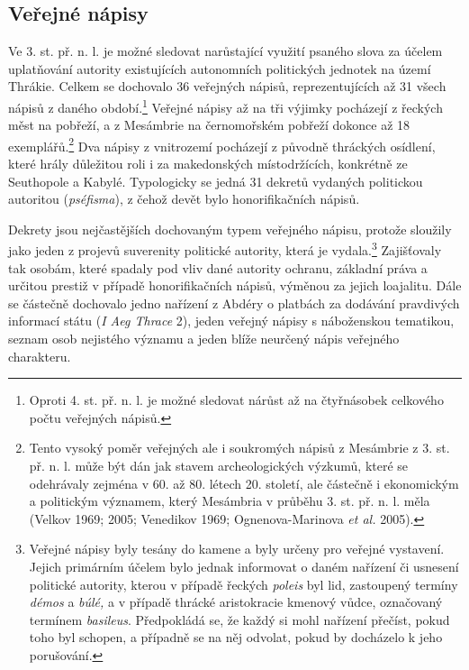 
\subsection[veřejné-nápisy-5]{Veřejné nápisy}

Ve 3. st. př. n. l. je možné sledovat narůstající využití psaného slova za účelem uplatňování autority existujících autonomních politických jednotek na území Thrákie. Celkem se dochovalo 36 veřejných nápisů, reprezentujících až 31  všech nápisů z daného období.\footnote{Oproti 4. st. př. n. l. je možné sledovat nárůst až na čtyřnásobek celkového počtu veřejných nápisů.} Veřejné nápisy až na tři výjimky pocházejí z řeckých měst na pobřeží, a z Mesámbrie na černomořském pobřeží dokonce až 18 exemplářů.\footnote{Tento vysoký poměr veřejných ale i soukromých nápisů z Mesámbrie z 3. st. př. n. l. může být dán jak stavem archeologických výzkumů, které se odehrávaly zejména v 60. až 80. létech 20. století, ale částečně i ekonomickým a politickým významem, který Mesámbria v průběhu 3. st. př. n. l. měla (Velkov 1969; 2005; Venedikov 1969; Ognenova-Marinova {\em et al.} 2005).} Dva nápisy z vnitrozemí pocházejí z původně thráckých osídlení, které hrály důležitou roli i za makedonských místodržících, konkrétně ze Seuthopole a Kabylé. Typologicky se jedná 31 dekretů vydaných politickou autoritou ({\em pséfisma}), z čehož devět bylo honorifikačních nápisů.

Dekrety jsou nejčastějších dochovaným typem veřejného nápisu, protože sloužily jako jeden z projevů suverenity politické autority, která je vydala.\footnote{Veřejné nápisy byly tesány do kamene a byly určeny pro veřejné vystavení. Jejich primárním účelem bylo jednak informovat o daném nařízení či usnesení politické autority, kterou v případě řeckých {\em poleis} byl lid, zastoupený termíny {\em démos} a {\em búlé,} a v případě thrácké aristokracie kmenový vůdce, označovaný termínem {\em basileus}. Předpokládá se, že každý si mohl nařízení přečíst, pokud toho byl schopen, a případně se na něj odvolat, pokud by docházelo k jeho porušování.} Zajišťovaly tak osobám, které spadaly pod vliv dané autority ochranu, základní práva a určitou prestiž v případě honorifikačních nápisů, výměnou za jejich loajalitu. Dále se částečně dochovalo jedno nařízení z Abdéry o platbách za dodávání pravdivých informací státu ({\em I Aeg Thrace} 2), jeden veřejný nápisy s náboženskou tematikou, seznam osob nejistého významu a jeden blíže neurčený nápis veřejného charakteru.

